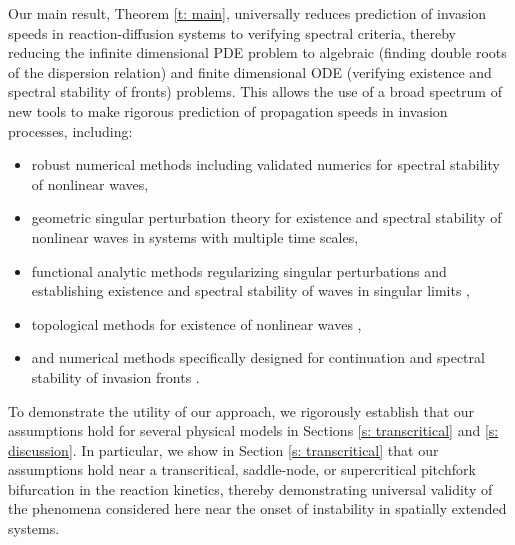 \documentclass[11pt]{article}
\numberwithin{equation}{section}
\numberwithin{prop}{section}
\begin{document}
Our main result, Theorem \ref{t: main}, universally reduces prediction of invasion speeds in reaction-diffusion systems to verifying spectral criteria, thereby reducing the infinite dimensional PDE problem to algebraic (finding double roots of the dispersion relation) and finite dimensional ODE (verifying existence and spectral stability of fronts) problems. This allows the use of a broad spectrum of new tools to make rigorous prediction of propagation speeds in invasion processes, including:
\begin{itemize}
	\item robust numerical methods \cite{ArndEigenvalues, Stablab} including validated numerics \cite{BeckJaquette} for spectral stability of nonlinear waves,
	\item geometric singular perturbation theory for existence \cite{Fenichel, cartersch} and spectral stability \cite{CarterdeRijkSandstede} of nonlinear waves in systems with multiple time scales,
	\item functional analytic methods regularizing singular perturbations and establishing existence and spectral stability of waves in singular limits \cite{AveryGarenaux, GohScheel, JensArnd},
	\item topological methods for existence of nonlinear waves \cite{vandenBerg, ArndCH1, ArndCH2},
	\item and numerical methods specifically designed for continuation and spectral stability of invasion fronts \cite{AveryHolzerScheel}. 
\end{itemize}


To demonstrate the utility of our approach, we rigorously establish that our assumptions hold for several physical models in Sections \ref{s: transcritical} and \ref{s: discussion}. In particular, we show in Section \ref{s: transcritical} that our assumptions hold near a transcritical, saddle-node, or supercritical pitchfork bifurcation in the reaction kinetics, thereby demonstrating universal validity of the phenomena considered here near the onset of instability in spatially extended systems. 
\end{document}
